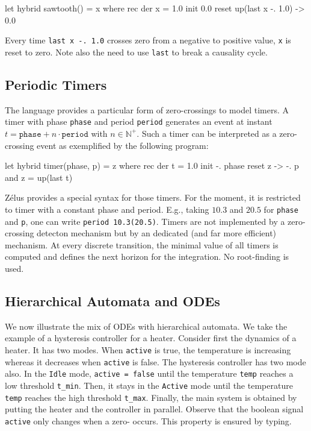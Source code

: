 \documentclass[11pt,titlepage,twoside]{report}
\newcommand{\zelus}{{\sf Z\'elus}}
\newcommand{\bN}{\mathbb{N}}
\begin{document}
\begin{runverbatim}[withresult]
let hybrid sawtooth() = x where
  rec der x = 1.0 init 0.0 reset up(last x -. 1.0) -> 0.0
\end{runverbatim}
%
Every time \texttt{last x -. 1.0} crosses zero from a negative to positive value,
\texttt{x} is reset to zero. Note also the need to use \texttt{last} to break
a causality cycle.

\subsection{Periodic Timers}
The language provides a particular form of zero-crossings to model
timers. A timer with phase \texttt{phase} and period \texttt{period} generates
an event at instant $t = \mathtt{phase} + n \cdot \mathtt{period}$ with
$n \in \bN^+$. Such a timer can be interpreted as a zero-crossing event as
exemplified by the following program:

\begin{runverbatim}[withresult]
let hybrid timer(phase, p) = z where
  rec der t = 1.0 init -. phase reset z -> -. p
  and z = up(last t)
\end{runverbatim}

\zelus{} provides a special syntax for those timers. For the moment,
it is restricted to timer with a constant phase and period. E.g.,
taking $10.3$ and $20.5$ for \texttt{phase} and \texttt{p}, one can
write \texttt{period 10.3(20.5)}. Timers are not implemented by a 
zero-crossing detecton mechanism
but by an dedicated (and far more efficient) mechanism. At every discrete transition,
the minimal value of all timers is computed and defines the next horizon for the
integration. No root-finding is used.

\subsection{Hierarchical Automata and ODEs}
We now illustrate the mix of \acp{ODE} with hierarchical automata. We take
the example of a hysteresis controller for a heater.  Consider first
the dynamics of a heater. It has two modes. When \texttt{active} is true,
the temperature is increasing whereas it decreases when
\texttt{active} is false. The hysteresis controller has two mode also. In the
\texttt{Idle} mode, \texttt{active = false} until the temperature
\texttt{temp} reaches a low threshold \verb-t_min-. Then, it stays in
the \texttt{Active} mode until the temperature \verb-temp- reaches the
high threshold \verb-t_max-. Finally, the main system is obtained by
putting the heater and the controller in parallel. Observe that the
boolean signal \verb-active- only changes when a zero-
occurs. This property is ensured by typing.
\end{document}
